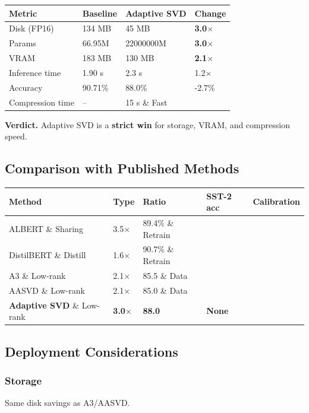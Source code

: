 \begin{table}[H]
\centering
\small
\begin{tabular}{llll}
\toprule
\textbf{Metric} & \textbf{Baseline} & \textbf{Adaptive SVD} & \textbf{Change} \\
\midrule
Disk (FP16) & 134 MB & 45 MB & \textbf{3.0$\times$} \\
Params & 66.95M & 22000000M & \textbf{3.0$\times$} \\
VRAM & 183 MB & 130 MB & \textbf{2.1$\times$} \\
Inference time & 1.90 s & 2.3 s & 1.2$\times$ \\
Accuracy & 90.71\% & 88.0\% & -2.7\% \\
Compression time & -- & 15 s \& Fast \\
\bottomrule
\end{tabular}
\end{table}

\textbf{Verdict.} Adaptive SVD is a \textbf{strict win} for storage, VRAM, and 
compression speed.

\subsection{Comparison with Published Methods}

\begin{table}[H]
\centering
\small
\begin{tabular}{lllll}
\toprule
\textbf{Method} & \textbf{Type} & \textbf{Ratio} & \textbf{SST-2 acc} & \textbf{Calibration} \\
\midrule
ALBERT \& Sharing & 3.5$\times$ & 89.4\% \& Retrain \\
DistilBERT \& Distill & 1.6$\times$ & 90.7\% \& Retrain \\
A3 \& Low-rank & 2.1$\times$ & 85.5 \& Data \\
AASVD \& Low-rank & 2.1$\times$ & 85.0 \& Data \\
\textbf{Adaptive SVD} \& Low-rank & \textbf{3.0$\times$} & \textbf{88.0} & \textbf{None} \\
\bottomrule
\end{tabular}
\end{table}

\subsection{Deployment Considerations}

\subsubsection{Storage}
Same disk savings as A3/AASVD.

